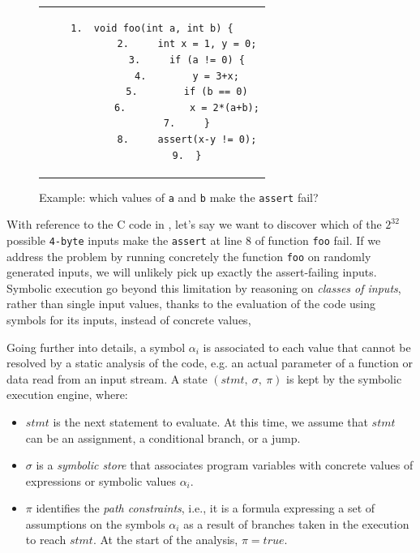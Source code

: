 \label{symbolic-execution-example}
\begin{figure}[t]
	\begin{center}
		\begin{tabular}{c}
			\hspace{-4.5cm}
			\begin{lstlisting}[basicstyle=\ttfamily\scriptsize]
			1.  void foo(int a, int b) {
			2.     int x = 1, y = 0;
			3.     if (a != 0) {
			4.        y = 3+x;
			5.        if (b == 0)
			6.           x = 2*(a+b);
			7.     }
			8.     assert(x-y != 0);
			9.  }
			\end{lstlisting}
		\end{tabular}
	\end{center}
	\vspace{-2mm}
	\caption{Example: which values of \texttt{a} and \texttt{b} make the \texttt{assert} fail?}
	\label{fig:example-1}
	\vspace{-1.5mm}
\end{figure}

With reference to the C code in , let's say we want to discover which of the $2^{32}$ possible \texttt{4-byte} inputs make the \texttt{assert} at line 8 of function \texttt{foo} fail. If we address the problem by running concretely the function \texttt{foo} on randomly generated inputs, we will unlikely pick up exactly the assert-failing inputs. Symbolic execution go beyond this limitation by reasoning on {\em classes of inputs}, rather than single input values, thanks to the evaluation of the code using symbols for its inputs, instead of concrete values,  

Going further into details, a symbol $\alpha_i$ is associated to each value that cannot be resolved by a static analysis of the code, e.g. an actual parameter of a function or data read from an input stream. A state $(stmt,~\sigma,~\pi)$ is kept by the symbolic execution engine, where:

\begin{itemize}
	\item $stmt$ is the next statement to evaluate. At this time, we assume that $stmt$ can be an assignment, a conditional branch, or a jump.
	
	\item $\sigma$ is a {\em symbolic store} that associates program variables with concrete values of expressions or symbolic values $\alpha_i$.
	
	\item $\pi$ identifies the {\em path constraints}, i.e., it is a formula expressing a set of assumptions on the symbols $\alpha_i$ as a result of branches taken in the execution to reach $stmt$. At the start of the analysis, $\pi=true$.
\end{itemize}

